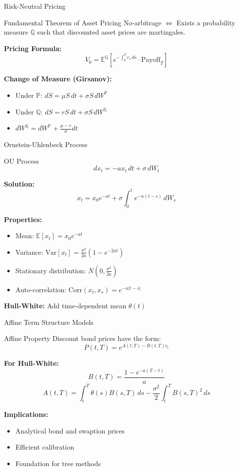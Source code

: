 \documentclass[aspectratio=169,11pt]{beamer}
\begin{document}
\begin{frame}{Risk-Neutral Pricing}
\begin{block}{Fundamental Theorem of Asset Pricing}
No-arbitrage $\Leftrightarrow$ Exists a probability measure $\mathbb{Q}$ such that discounted asset prices are martingales.
\end{block}

\textbf{Pricing Formula:}
\[
V_0 = \mathbb{E}^\mathbb{Q}\left[e^{-\int_0^T r_s\,ds} \cdot \text{Payoff}_T\right]
\]

\textbf{Change of Measure (Girsanov):}
\begin{itemize}
    \item Under $\mathbb{P}$: $dS = \mu S\,dt + \sigma S\,dW^\mathbb{P}$
    \item Under $\mathbb{Q}$: $dS = r S\,dt + \sigma S\,dW^\mathbb{Q}$
    \item $dW^\mathbb{Q} = dW^\mathbb{P} + \frac{\mu - r}{\sigma}dt$
\end{itemize}
\end{frame}

\begin{frame}{Ornstein-Uhlenbeck Process}
\begin{block}{OU Process}
\[
dx_t = -a x_t\,dt + \sigma\,dW_t
\]
\end{block}

\textbf{Solution:}
\[
x_t = x_0 e^{-at} + \sigma \int_0^t e^{-a(t-s)}\,dW_s
\]

\textbf{Properties:}
\begin{itemize}
    \item Mean: $\mathbb{E}[x_t] = x_0 e^{-at}$
    \item Variance: $\text{Var}[x_t] = \frac{\sigma^2}{2a}(1 - e^{-2at})$
    \item Stationary distribution: $N(0, \frac{\sigma^2}{2a})$
    \item Auto-correlation: $\text{Corr}(x_t, x_s) = e^{-a|t-s|}$
\end{itemize}

\textbf{Hull-White:} Add time-dependent mean $\theta(t)$
\end{frame}

\begin{frame}{Affine Term Structure Models}
\begin{block}{Affine Property}
Discount bond prices have the form:
\[
P(t, T) = e^{A(t,T) - B(t,T) r_t}
\]
\end{block}

\textbf{For Hull-White:}
\[
B(t, T) = \frac{1 - e^{-a(T-t)}}{a}
\]
\[
A(t, T) = \int_t^T \theta(s) B(s, T)\,ds - \frac{\sigma^2}{2}\int_t^T B(s, T)^2\,ds
\]

\textbf{Implications:}
\begin{itemize}
    \item Analytical bond and swaption prices
    \item Efficient calibration
    \item Foundation for tree methods
\end{itemize}
\end{frame}
\end{document}
